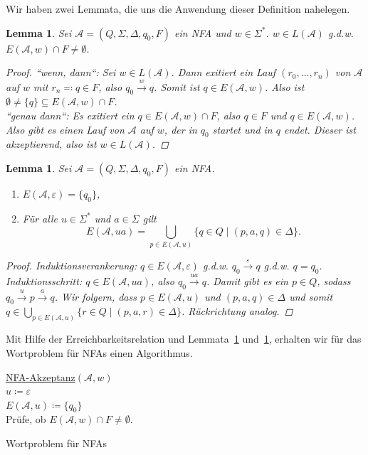 \documentclass[11pt, a4paper]{article}
\theoremstyle{definition}
\theoremstyle{plain}
\newtheorem{lemma}[definition]{Lemma}
\numberwithin{equation}{section}
\newcommand{\reaches}[1]{\overset{#1}{\rightarrow}}
\begin{document}
Wir haben zwei Lemmata, die uns die Anwendung dieser Definition nahelegen.
\begin{lemma}\label{lem:reach1}
	Sei \( \mathcal{A} = (Q, \Sigma, \Delta, q_0, F)\) ein NFA und \( w \in \Sigma^\ast \). \( w \in L(\mathcal{A}) \) {g.d.w.} \( E(\mathcal{A}, w) \cap F \neq \emptyset \).
	\begin{proof}
		``wenn, dann``: Sei \( w \in L(\mathcal{A}) \). Dann exitiert ein Lauf \( (r_0, \ldots, r_n) \) von \( \mathcal{A} \) auf \( w \) mit \( r_n \eqqcolon q \in F \), also \( q_0 \reaches{w} q \). Somit ist \( q \in E(\mathcal{A}, w) \). Also ist \( \emptyset \neq \{q\} \subseteq E(\mathcal{A}, w) \cap F \).\\
		``genau dann``: Es exitiert ein \( q \in E(\mathcal{A}, w) \cap F \), also \( q \in F \) und \( q \in E(\mathcal{A}, w) \). Also gibt es einen Lauf von \( \mathcal{A} \) auf \( w \), der in \( q_0 \) startet und in \( q \) endet. Dieser ist akzeptierend, also ist \( w \in L(\mathcal{A}) \).
	\end{proof}
\end{lemma}
\begin{lemma}\label{lem:reach2}
	Sei \( \mathcal{A} = (Q, \Sigma, \Delta, q_0, F) \) ein NFA.
	\begin{enumerate}
		\item \( E(\mathcal{A}, \varepsilon) = \{q_0\} \),
		\item Für alle \( u \in \Sigma^\ast \) und \( a \in \Sigma \) gilt
			\[
				E(\mathcal{A}, ua) = \bigcup_{p \in E(\mathcal{A}, u)} \{ q \in Q \mid (p, a, q) \in \Delta \}.
			\]
	\end{enumerate}
	\begin{proof}
		Induktionsverankerung: \( q \in E(\mathcal{A}, \varepsilon) \) {g.d.w.} \( q_0 \reaches{\varepsilon} q \) {g.d.w.} \( q = q_0 \). \checkmark\\
		Induktionsschritt: \( q \in E(\mathcal{A}, ua) \), also \( q_0 \reaches{ua} q \). Damit gibt es ein \( p \in Q \), sodass \( q_0 \reaches{u} p \reaches{a} q \). Wir folgern, dass \( p \in E(\mathcal{A}, u) \) und \( (p, a, q) \in \Delta \) und somit \( q \in \bigcup_{p \in E(\mathcal{A}, u)} \{ r \in Q \mid (p, a, r) \in \Delta \} \). Rückrichtung analog.
	\end{proof}
\end{lemma}
Mit Hilfe der Erreichbarkeitsrelation und Lemmata~\ref{lem:reach1} und~\ref{lem:reach2}, erhalten wir für das Wortproblem für NFAs einen Algorithmus.
\begin{algorithm}
	\underline{NFA-Akzeptanz}{$(\mathcal{A}, w)$}\\
	$u \coloneqq \varepsilon$\\
	$E(\mathcal{A}, u) \coloneqq \{ q_0 \}$\\	
	Prüfe, ob $E(\mathcal{A}, w) \cap F \neq \emptyset$.
	\caption{Wortproblem für NFAs}
	\label{alg:nfaacc}
\end{algorithm}
\end{document}
